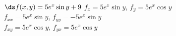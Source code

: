 {$\ds f(x,y) =5e^x\sin y+9$}
{$f_x=5e^x\sin y$, $f_y=5e^x\cos y$\\
$f_{xx}=5e^x\sin y$, $f_{yy}=-5e^x\sin y$\\
$f_{xy}=5e^x\cos y$, $f_{yx}=5e^x\cos y$\\
}